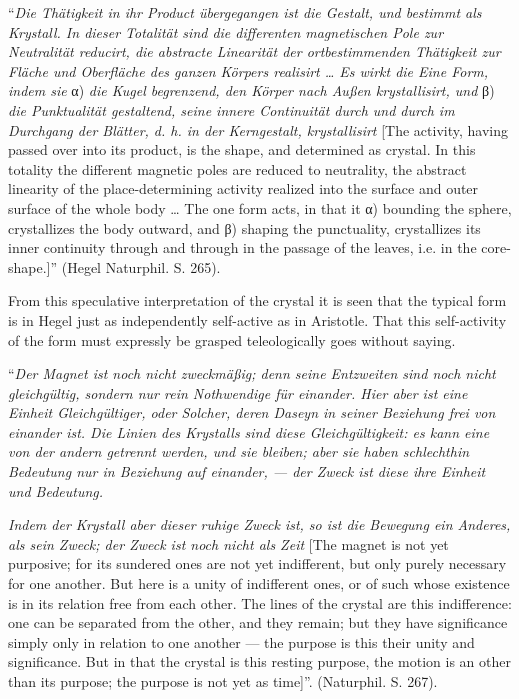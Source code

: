 \documentclass[12pt]{book}
\begin{document}
``\textit{Die Thätigkeit in ihr Product übergegangen ist die Gestalt, und bestimmt als Krystall. In
dieser Totalität sind die differenten magnetischen Pole zur Neutralität reducirt, die abstracte
Linearität der ortbestimmenden Thätigkeit zur Fläche und Oberfläche des ganzen Körpers realisirt
\ldots{} Es wirkt die Eine Form, indem sie} α) \textit{die Kugel begrenzend, den Körper nach Außen
krystallisirt, und} β) \textit{die Punktualität gestaltend, seine innere Continuität durch und durch im
Durchgang der Blätter, d. h. in der Kerngestalt, krystallisirt} [The activity, having passed over into
its product, is the shape, and determined as crystal. In this totality the different magnetic poles are
reduced to neutrality, the abstract linearity of the place-determining activity realized into the
surface and outer surface of the whole body \ldots{} The one form acts, in that it α) bounding the
sphere, crystallizes the body outward, and β) shaping the punctuality, crystallizes its inner
continuity through and through in the passage of the leaves, i.e. in the core-shape.]'' (Hegel
Naturphil. S. 265).

From this speculative interpretation of the crystal it is seen that the typical form is in Hegel just as
independently self-active as in Aristotle. That this self-activity of the form must expressly be grasped
teleologically goes without saying.

``\textit{Der Magnet ist noch nicht zweckmäßig; denn seine Entzweiten sind noch nicht gleichgültig,
sondern nur rein Nothwendige für einander. Hier aber ist eine Einheit Gleichgültiger, oder Solcher,
deren Daseyn in seiner Beziehung frei von einander ist. Die Linien des Krystalls sind diese
Gleichgültigkeit: es kann eine von der andern getrennt werden, und sie bleiben; aber sie haben
schlechthin Bedeutung nur in Beziehung auf einander, --- der Zweck ist diese ihre Einheit und
Bedeutung.}

\textit{Indem der Krystall aber dieser ruhige Zweck ist, so ist die Bewegung ein Anderes, als sein
Zweck; der Zweck ist noch nicht als Zeit} [The magnet is not yet purposive; for its sundered ones are not yet
indifferent, but only purely necessary for one another. But here is a unity of indifferent ones, or of
such whose existence is in its relation free from each other. The lines of the crystal are this
indifference: one can be separated from the other, and they remain; but they have significance simply
only in relation to one another --- the purpose is this their unity and significance. But in that the
crystal is this resting purpose, the motion is an other than its purpose; the purpose is not yet as
time]''. (Naturphil. S. 267).
\end{document}
